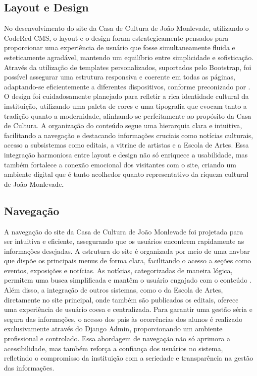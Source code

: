 \subsection{Layout e Design}

No desenvolvimento do site da Casa de Cultura de João Monlevade, utilizando o CodeRed CMS, o layout e o design foram estrategicamente pensados para proporcionar uma experiência de usuário que fosse simultaneamente fluida e esteticamente agradável, mantendo um equilíbrio entre simplicidade e sofisticação. Através da utilização de templates personalizados, suportados pelo Bootstrap, foi possível assegurar uma estrutura responsiva e coerente em todas as páginas, adaptando-se eficientemente a diferentes dispositivos, conforme preconizado por \cite{liddle2013design}. O design foi cuidadosamente planejado para refletir a rica identidade cultural da instituição, utilizando uma paleta de cores e uma tipografia que evocam tanto a tradição quanto a modernidade, alinhando-se perfeitamente ao propósito da Casa de Cultura. A organização do conteúdo segue uma hierarquia clara e intuitiva, facilitando a navegação e destacando informações cruciais como notícias culturais, acesso a subsistemas como editais, a vitrine de artistas e a Escola de Artes. Essa integração harmoniosa entre layout e design não só enriquece a usabilidade, mas também fortalece a conexão emocional dos visitantes com o site, criando um ambiente digital que é tanto acolhedor quanto representativo da riqueza cultural de João Monlevade.

\subsection{Navegação}

A navegação do site da Casa de Cultura de João Monlevade foi projetada para ser intuitiva e eficiente, assegurando que os usuários encontrem rapidamente as informações desejadas. A estrutura do site é organizada por meio de uma navbar que dispõe os principais menus de forma clara, facilitando o acesso a seções como eventos, exposições e notícias. As notícias, categorizadas de maneira lógica, permitem uma busca simplificada e mantêm o usuário engajado com o conteúdo \cite{nielsen2012usability}. Além disso, a integração de outros sistemas, como o da Escola de Artes, diretamente no site principal, onde também são publicados os editais, oferece uma experiência de usuário coesa e centralizada. Para garantir uma gestão séria e segura das informações, o acesso dos pais às ocorrências dos alunos é realizado exclusivamente através do Django Admin, proporcionando um ambiente profissional e controlado. Essa abordagem de navegação não só aprimora a acessibilidade, mas também reforça a confiança dos usuários no sistema, refletindo o compromisso da instituição com a seriedade e transparência na gestão das informações.

